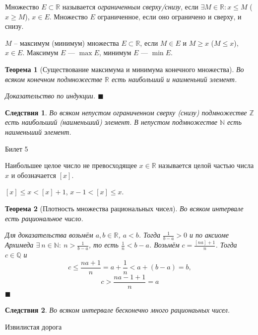 \documentclass[12pt,a4paper]{article}
\newtheorem*{theorem*}{Теорема}
\newtheorem*{conseq*}{Следствия}
\begin{document}
Множество $E \subset \mathbb{R}$ называется \textit{ограниченным сверху/снизу}, если $\exists M \in \mathbb{R}: x \leq M$ ($x \geq M$), $x \in E$. Множество $E$ ограниченное, если оно ограничено и сверху, и снизу.

$M$ -- максимум (минимум) множества $E \subset \mathbb{R}$, если $M \in E$ и $M \geq x$ ($M \leq x$), $x \in E$. Максимум $E$ --- $\max E$, минимум $E$ --- $\min E$.

\begin{theorem*}[Существование максимума и минимума конечного множества]
\label{4.1}
Во всяком конечном подмножестве $\mathbb{R}$ есть наибольший и наименьний элемент.

Доказательство по индукции. $\blacksquare$
\end{theorem*}

\begin{conseq*}
\label{4.2}
Во всяком непустом ограниченном сверху (снизу) подмножестве $\mathbb{Z}$ есть наибольший (наименьший) элемент.
\newline
В непустом подмножестве $\mathbb{N}$ есть наименьший элемент.
\end{conseq*}

\begin{center}
Билет 5
\end{center}

Наибольшее целое число не превосходящее $x \in \mathbb{R}$ называется целой частью числа $x$ и обозначается $[x]$.

$[x] \leq x < [x] + 1$, $x - 1 < [x] \leq x$.

\begin{theorem*}[Плотность множества рациональных чисел]
\label{5.1}
Во всяком интервале есть рациональное число.

Для доказательства возьмём $a, b \in \mathbb{R}$, $a < b$. Тогда $\frac{1}{b-a} > 0$ и по аксиоме Архимеда $\exists\  n \in \mathbb{N}:\ n > \frac{1}{b-a}$, то есть $\frac{1}{n} < b-a$. Возьмём $c=\frac{[na]+1}{n}$. Тогда $c \in \mathbb{Q}$ и
\newline 
$$
c \leq \frac{na+1}{n}=a+\frac{1}{n}<a+(b-a)=b,
$$
$$
c > \frac{na-1+1}{n}=a
$$ $\blacksquare$
\end{theorem*}

\begin{conseq*}
\label{5.2}
Во всяком интервале бесконечно много рационаьных чисел.
\end{conseq*}

\begin{center}
Извилистая дорога
\end{center}
\end{document}
